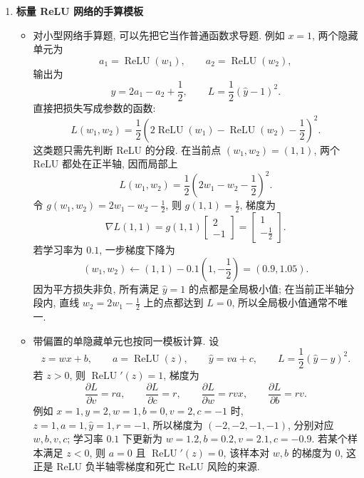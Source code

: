\documentclass{../nndlcourse}
\begin{document}
\begin{enumerate}
    \item \textbf{标量 ReLU 网络的手算模板}
    \begin{itemize}
        \item 对小型网络手算题, 可以先把它当作普通函数求导题. 例如 $x=1$, 两个隐藏单元为
        \[
            a_1=\operatorname{ReLU}(w_1),\qquad
            a_2=\operatorname{ReLU}(w_2),
        \]
        输出为
        \[
            \hat{y}=2a_1-a_2+\frac{1}{2},
            \qquad
            L=\frac{1}{2}{\left(\hat{y}-1\right)}^2.
        \]
        直接把损失写成参数的函数:
        \[
            L(w_1,w_2)
            =
            \frac{1}{2}
            {\left(
                2\operatorname{ReLU}(w_1)
                -
                \operatorname{ReLU}(w_2)
                -
                \frac{1}{2}
            \right)}^2.
        \]
        这类题只需先判断 ReLU 的分段. 在当前点 $(w_1,w_2)=(1,1)$, 两个 ReLU 都处在正半轴, 因而局部上
        \[
            L(w_1,w_2)
            =
            \frac{1}{2}
            {\left(
                2w_1-w_2-\frac{1}{2}
            \right)}^2.
        \]
        令 $g(w_1,w_2)=2w_1-w_2-\frac{1}{2}$, 则 $g(1,1)=\frac{1}{2}$, 梯度为
        \[
            \nabla L(1,1)
            =
            g(1,1)
            \begin{bmatrix}
            2\\
            -1
            \end{bmatrix}
            =
            \begin{bmatrix}
            1\\
            -\frac{1}{2}
            \end{bmatrix}.
        \]
        若学习率为 $0.1$, 一步梯度下降为
        \[
            (w_1,w_2)
            \leftarrow
            (1,1)
            -
            0.1
            \left(
                1,-\frac{1}{2}
            \right)
            =
            (0.9,1.05).
        \]
        因为平方损失非负, 所有满足 $\hat{y}=1$ 的点都是全局极小值; 在当前正半轴分段内, 直线 $w_2=2w_1-\frac{1}{2}$ 上的点都达到 $L=0$, 所以全局极小值通常不唯一.
        \item 带偏置的单隐藏单元也按同一模板计算. 设
        \[
            z=wx+b,\qquad a=\operatorname{ReLU}(z),
            \qquad \hat{y}=va+c,\qquad
            L=\frac{1}{2}{\left(\hat{y}-y\right)}^2.
        \]
        若 $z>0$, 则 $\operatorname{ReLU}'(z)=1$, 梯度为
        \[
            \frac{\partial L}{\partial v}=ra,\qquad
            \frac{\partial L}{\partial c}=r,\qquad
            \frac{\partial L}{\partial w}=rvx,\qquad
            \frac{\partial L}{\partial b}=rv.
        \]
        例如 $x=1,y=2,w=1,b=0,v=2,c=-1$ 时, $z=1,a=1,\hat{y}=1,r=-1$, 所以梯度为 $(-2,-2,-1,-1)$, 分别对应 $w,b,v,c$; 学习率 $0.1$ 下更新为 $w=1.2,b=0.2,v=2.1,c=-0.9$. 若某个样本满足 $z<0$, 则 $a=0$ 且 $\operatorname{ReLU}'(z)=0$, 该样本对 $w,b$ 的梯度为 $0$, 这正是 ReLU 负半轴零梯度和死亡 ReLU 风险的来源.
    \end{itemize}


\end{enumerate}
\end{document}

